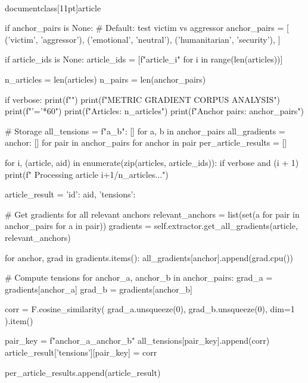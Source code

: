 \\documentclass[11pt]{article}
\begin{document}
\begin{CodeBlock}
        if anchor_pairs is None:
            # Default: test victim vs aggressor
            anchor_pairs = [
                ('victim', 'aggressor'),
                ('emotional', 'neutral'),
                ('humanitarian', 'security'),
            ]
        
        if article_ids is None:
            article_ids = [f"article_{i}" for i in range(len(articles))]
        
        n_articles = len(articles)
        n_pairs = len(anchor_pairs)
        
        if verbose:
            print(f"")
            print(f"METRIC GRADIENT CORPUS ANALYSIS")
            print(f"{'='*60}")
            print(f"Articles: {n_articles}")
            print(f"Anchor pairs: {anchor_pairs}")
        
        # Storage
        all_tensions = {f"{a}_{b}": [] for a, b in anchor_pairs}
        all_gradients = {anchor: [] for pair in anchor_pairs for anchor in pair}
        per_article_results = []
        
        for i, (article, aid) in enumerate(zip(articles, article_ids)):
            if verbose and (i + 1) %
                print(f"  Processing article {i+1}/{n_articles}...")
            
            article_result = {'id': aid, 'tensions': {}}
            
            # Get gradients for all relevant anchors
            relevant_anchors = list(set(a for pair in anchor_pairs for a in pair))
            gradients = self.extractor.get_all_gradients(article, relevant_anchors)
            
            for anchor, grad in gradients.items():
                all_gradients[anchor].append(grad.cpu())
            
            # Compute tensions
            for anchor_a, anchor_b in anchor_pairs:
                grad_a = gradients[anchor_a]
                grad_b = gradients[anchor_b]
                
                corr = F.cosine_similarity(
                    grad_a.unsqueeze(0),
                    grad_b.unsqueeze(0),
                    dim=1
                ).item()
                
                pair_key = f"{anchor_a}_{anchor_b}"
                all_tensions[pair_key].append(corr)
                article_result['tensions'][pair_key] = corr
            
            per_article_results.append(article_result)
        

\end{CodeBlock}
\end{document}
